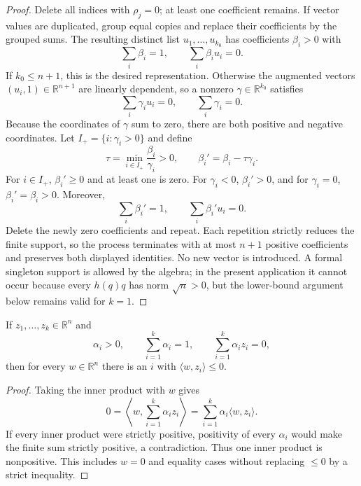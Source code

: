 \begin{proof}
Delete all indices with $\rho_j=0$; at least one coefficient remains.
If vector values are duplicated, group equal copies and replace their
coefficients by the grouped sums.  The resulting distinct list
$u_1,\ldots,u_{k_0}$ has coefficients $\beta_i>0$ with
\[
\sum_i\beta_i=1,\qquad\sum_i\beta_i u_i=0.
\]
If $k_0\leq n+1$, this is the desired representation.  Otherwise the
augmented vectors $(u_i,1)\in\mathbb R^{n+1}$ are linearly dependent, so a
nonzero $\gamma\in\mathbb R^{k_0}$ satisfies
\[
\sum_i\gamma_i u_i=0,\qquad\sum_i\gamma_i=0.
\]
Because the coordinates of $\gamma$ sum to zero, there are both positive and
negative coordinates.  Let $I_+=\{i:\gamma_i>0\}$ and define
\[
 \tau=\min_{i\in I_+}\frac{\beta_i}{\gamma_i}>0,
 \qquad
 \beta_i'=\beta_i-\tau\gamma_i.
\]
For $i\in I_+$, $\beta_i'\geq0$ and at least one is zero.  For
$\gamma_i<0$, $\beta_i'>0$, and for $\gamma_i=0$, $\beta_i'=\beta_i>0$.
Moreover,
\[
\sum_i\beta_i'=1,\qquad
\sum_i\beta_i'u_i=0.
\]
Delete the newly zero coefficients and repeat.  Each repetition strictly
reduces the finite support, so the process terminates with at most $n+1$
positive coefficients and preserves both displayed identities.  No new vector
is introduced.  A formal singleton support is allowed by the algebra; in the
present application it cannot occur because every $h(q)q$ has norm
$\sqrt n>0$, but the lower-bound argument below remains valid for $k=1$.
\end{proof}

\begin{lemma}
\label{lem:step-005-signed-cancellation}
If $z_1,\ldots,z_k\in\mathbb R^n$ and
\[
\alpha_i>0,\qquad \sum_{i=1}^k\alpha_i=1,\qquad
\sum_{i=1}^k\alpha_i z_i=0,
\]
then for every $w\in\mathbb R^n$ there is an $i$ with
$\langle w,z_i\rangle\leq0$.
\end{lemma}

\begin{proof}
Taking the inner product with $w$ gives
\[
0=\left\langle w,\sum_{i=1}^k\alpha_i z_i\right\rangle
=\sum_{i=1}^k\alpha_i\langle w,z_i\rangle.
\]
If every inner product were strictly positive, positivity of every
$\alpha_i$ would make the finite sum strictly positive, a contradiction.
Thus one inner product is nonpositive.  This includes $w=0$ and equality
cases without replacing $\leq0$ by a strict inequality.
\end{proof}

